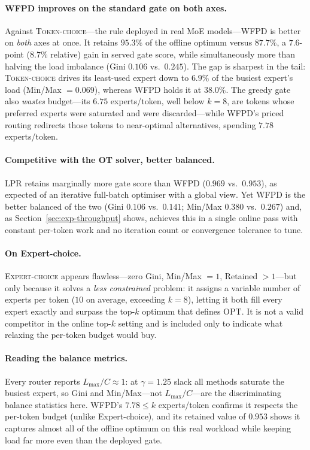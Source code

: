 \documentclass[preprint,12pt]{elsarticle}
\theoremstyle{plain}
\theoremstyle{remark}
\newcommand{\opt}{\mathrm{OPT}}
\newcommand{\Lmax}{L_{\max}}
\begin{document}
\paragraph{WFPD improves on the standard gate on both axes.}
Against \textsc{Token-choice}---the rule deployed in real MoE models---WFPD
is better on \emph{both} axes at once. It retains $95.3\%$ of the offline
optimum versus $87.7\%$, a $7.6$-point ($8.7\%$ relative) gain in served
gate score, while simultaneously more than halving the load imbalance (Gini
$0.106$ vs.\ $0.245$). The gap is sharpest in the tail:
\textsc{Token-choice} drives its least-used expert down to $6.9\%$ of the
busiest expert's load (Min/Max $=0.069$), whereas WFPD holds it at $38.0\%$.
The greedy gate also \emph{wastes} budget---its $6.75$ experts/token, well
below $k=8$, are tokens whose preferred experts were saturated and were
discarded---while WFPD's priced routing redirects those tokens to
near-optimal alternatives, spending $7.78$ experts/token.

\paragraph{Competitive with the OT solver, better balanced.}
\textsc{LPR} retains marginally more gate score than WFPD ($0.969$ vs.\
$0.953$), as expected of an iterative full-batch optimiser with a global
view. Yet WFPD is the better balanced of the two (Gini $0.106$ vs.\ $0.141$;
Min/Max $0.380$ vs.\ $0.267$) and, as Section~\ref{sec:exp-throughput}
shows, achieves this in a single online pass with constant per-token work
and no iteration count or convergence tolerance to tune.

\paragraph{On Expert-choice.}
\textsc{Expert-choice} appears flawless---zero Gini, Min/Max $=1$, Retained
$>1$---but only because it solves a \emph{less constrained} problem: it
assigns a variable number of experts per token ($10$ on average, exceeding
$k=8$), letting it both fill every expert exactly and surpass the top-$k$
optimum that defines $\opt$. It is not a valid competitor in the online
top-$k$ setting and is included only to indicate what relaxing the per-token
budget would buy.

\paragraph{Reading the balance metrics.}
Every router reports $\Lmax/C\approx 1$: at $\gamma=1.25$ slack all methods
saturate the busiest expert, so Gini and Min/Max---not $\Lmax/C$---are the
discriminating balance statistics here. WFPD's $7.78\le k$ experts/token
confirms it respects the per-token budget (unlike Expert-choice), and its
retained value of $0.953$ shows it captures almost all of the offline
optimum on this real workload while keeping load far more even than the
deployed gate.
\end{document}
